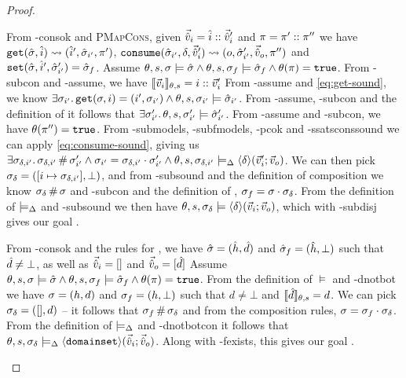 \begin{proof}
\begin{hypvlist}
 From \hyp{consok} and \textsc{PMapCons}, given $\vec{\hat{v}}_i=\hat{i}::\vec{\hat{v}}_i'$ and $\pi=\pi'::\pi''$ we have $\texttt{get}(\hat{\sigma},\hat{i})\rightsquigarrow(\hat{i}', \hat{\sigma}_{i'}, \pi')$, ${\texttt{consume}(\hat{\sigma}_{i'},\delta,\vec{\hat{v}}_i')\rightsquigarrow (o,\hat{\sigma}_{i'}',\vec{\hat{v}}_o,\pi'')}$ and $\texttt{set}(\hat{\sigma},\hat{i}',\hat{\sigma}_{i'}')=\hat{\sigma}_f$.
 Assume $\theta,s,\sigma\models \hat{\sigma} \land \theta,s,\sigma_f\models \hat{\sigma}_f \land \theta(\pi)=\texttt{true}$.
 From \hyp{subcon} and \hyp{assume}, we have $\llbracket\vec{v}_i\rrbracket_{\theta,s}=i::\vec{v}_i'$
 From \hyp{assume} and \ref{eq:get-sound}, we know $\exists \sigma_{i'}\ldotp \texttt{get}(\sigma,i)=(i',\sigma_{i'}) \land \theta,s,\sigma_{i'}\models\hat{\sigma}_{i'}$.
 From \hyp{assume}, \hyp{subcon} and the definition of  it follows that $\exists \sigma_{i'}'\ldotp \theta,s,\sigma_{i'}'\models\hat{\sigma}_{i'}'$.
 From \hyp{assume} and \hyp{subcon}, we have $\theta(\pi'')=\texttt{true}$.
 From \hyp{submodels}, \hyp{subfmodels}, \hyp{pcok} and \hyp{ssatsconssound} we can apply \ref{eq:consume-sound}, giving us $\exists \sigma_{\delta,i'}\ldotp \sigma_{\delta,i'}\operatorname{\#} \sigma_{i'}' \land \sigma_{i'}=\sigma_{\delta,i'}\cdot\sigma_{i'}' \land \theta,s,\sigma_{\delta,i'}\models_{\Delta} \left<\delta\right>\!(\vec{v}_i';\vec{v}_o)$.
 We can then pick $\sigma_\delta=([i\mapsto \sigma_{\delta,i'}], \bot)$, and from \hyp{subsound} and the definition of composition we know $\sigma_\delta\operatorname{\#}\sigma$ and \hyp{subcon} and the definition of , $\sigma_f=\sigma\cdot\sigma_\delta$.
 From the definition of $\models_{\Delta}$ and \hyp{subsound} we then have $\theta,s,\sigma_\delta\models\left<\delta\right>\!(\vec{v}_i;\vec{v}_o)$, which with \hyp{subdisj} gives our goal .
\end{hypvlist}

\pfcase{$\delta = \domainset$}

\begin{hypvlist}
 From \hyp{consok} and the rules for \consume{}, we have $\hat{\sigma}=(\hat{h},\hat{d})$ and $\hat{\sigma}_f=(\hat{h},\bot)$ such that $\hat{d}\neq\bot$, as well as $\vec{\hat{v}}_i=[]$ and $\vec{\hat{v}}_o=[\hat{d}]$
 Assume $\theta,s,\sigma\models \hat{\sigma} \land \theta,s,\sigma_f\models \hat{\sigma}_f \land \theta(\pi)=\texttt{true}$.
 From the definition of $\models$ and \hyp{dnotbot} we have $\sigma=(h,d)$ and $\sigma_f=(h,\bot)$ such that $d\neq\bot$ and $\llbracket\hat{d}\rrbracket_{\theta,s}=d$.
 We can pick $\sigma_\delta=([],d)$ -- it follows that $\sigma_f\operatorname{\#}\sigma_\delta$ and from the composition rules, $\sigma=\sigma_f\cdot\sigma_\delta$.
 From the definition of $\models_{\Delta}$ and \hyp{dnotbotcon} it follows that $\theta,s,\sigma_\delta\models_{\Delta}\left<\texttt{domainset}\right>\!(\vec{\hat{v}}_i;\vec{\hat{v}}_o)$. Along with \hyp{fexists}, this gives our goal .
\end{hypvlist}


\end{proof}
